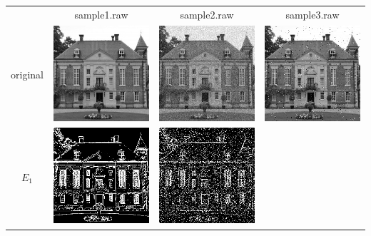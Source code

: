 \documentclass[12pt,a4paper,notitlepage,oneside,amsmath,amssymb]{article}
\begin{document}
\begin{CJK*}{UTF8}{bkai}
\begin{enumerate}[label=(\alph*)]
		      \begin{table}
		      \begin{tabular}[h!]{cccc}
			                                                        & sample1.raw & sample2.raw & sample3.raw \\
			      original                                          &
			      \includegraphics[width=.25\linewidth]{sample1}    &
			      \includegraphics[width=.25\linewidth]{sample2}    &
			      \includegraphics[width=.25\linewidth]{sample3}                                              \\
			      \(E_1\)                                           &
			      \includegraphics[width=.25\linewidth]{E1_sample1} &
			      \includegraphics[width=.25\linewidth]{E1_sample2} &

\end{tabular}
\end{table}
\end{enumerate}
\end{CJK*}
\end{document}

